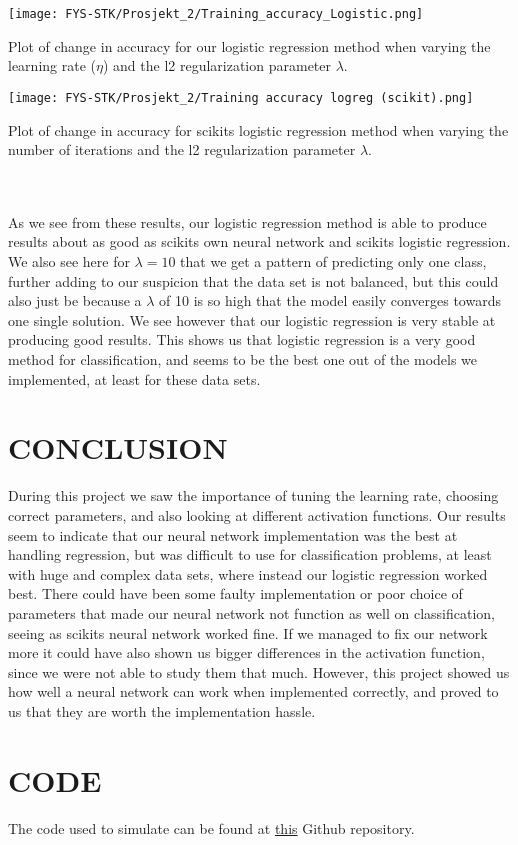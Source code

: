 \documentclass[english,notitlepage,reprint,nofootinbib]{revtex4-1}  %
\begin{document}
\texttt{[image: FYS-STK/Prosjekt\_2/Training\_accuracy\_Logistic.png]}
\caption{Plot of change in accuracy for our logistic regression method when varying the learning rate ($\eta$) and the l2 regularization parameter $\lambda$.}

\texttt{[image: FYS-STK/Prosjekt\_2/Training accuracy logreg (scikit).png]}
\caption{Plot of change in accuracy for scikits logistic regression method when varying the number of iterations and the l2 regularization parameter $\lambda$.}
\\
\\
As we see from these results, our logistic regression method is able to produce results about as good as scikits own neural network and scikits logistic regression. We also see here for $\lambda = 10$ that we get a pattern of predicting only one class, further adding to our suspicion that the data set is not balanced, but this could also just be because a $\lambda$ of 10 is so high that the model easily converges towards one single solution. We see however that our logistic regression is very stable at producing good results. This shows us that logistic regression is a very good method for classification, and seems to be the best one out of the models we implemented, at least for these data sets.

\section{CONCLUSION}\label{sec:CONCLUSION}
During this project we saw the importance of tuning the learning rate, choosing correct parameters, and also looking at different activation functions. Our results seem to indicate that our neural network implementation was the best at handling regression, but was difficult to use for classification problems, at least with huge and complex data sets, where instead our logistic regression worked best. There could have been some faulty implementation or poor choice of parameters that made our neural network not function as well on classification, seeing as scikits neural network worked fine. If we managed to fix our network more it could have also shown us bigger differences in the activation function, since we were not able to study them that much. However, this project showed us how well a neural network can work when implemented correctly, and proved to us that they are worth the implementation hassle. 

\section{CODE}\label{sec:CODE}
The code used to simulate can be found at \href{https://github.com/erlend1202/FYS_STK4155_Prosjekt_2}{this} Github repository.
\end{document}
